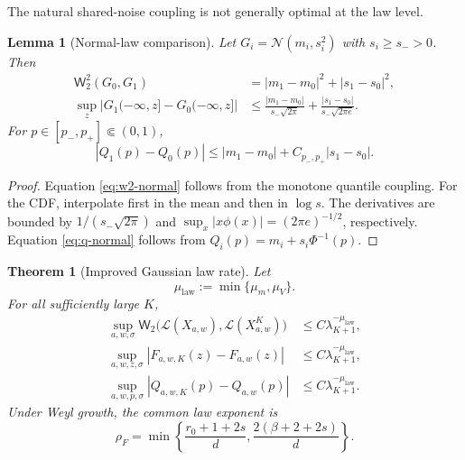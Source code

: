 \documentclass[11pt]{article}
\newtheorem{theorem}[assumption]{Theorem}
\newtheorem{lemma}[assumption]{Lemma}
\theoremstyle{remark}
\newcommand{\Law}{\mathcal L}
\newcommand{\Ph}{\Phi}
\newcommand{\ph}{\phi}
\newcommand{\Wtwo}{\mathsf W_2}
\begin{document}
The natural shared-noise coupling is not generally optimal at the law level.

\begin{lemma}[Normal-law comparison]\label{lem:normal-comparison}
Let $G_i=\mathcal N(m_i,s_i^2)$ with $s_i\ge s_->0$. Then
\begin{align}
 \Wtwo^2(G_0,G_1)
 &=|m_1-m_0|^2+|s_1-s_0|^2,
 \label{eq:w2-normal}\\
 \sup_z|G_1(-\infty,z]-G_0(-\infty,z]|
 &\le
 \frac{|m_1-m_0|}{s_-\sqrt{2\pi}}
 +\frac{|s_1-s_0|}{s_-\sqrt{2\pi e}}.
 \label{eq:kol-normal}
\end{align}
For $p\in[p_-,p_+]\Subset(0,1)$,
\begin{equation}\label{eq:q-normal}
 |Q_1(p)-Q_0(p)|
 \le|m_1-m_0|+C_{p_-,p_+}|s_1-s_0|.
\end{equation}
\end{lemma}

\begin{proof}
Equation \eqref{eq:w2-normal} follows from the monotone quantile coupling. For the CDF, interpolate first in the mean and then in $\log s$. The derivatives are bounded by $1/(s_-\sqrt{2\pi})$ and $\sup_x|x\ph(x)|=(2\pi e)^{-1/2}$, respectively. Equation \eqref{eq:q-normal} follows from $Q_i(p)=m_i+s_i\Ph^{-1}(p)$.
\end{proof}

\begin{theorem}[Improved Gaussian law rate]\label{thm:law-rate}
Let
\begin{equation}\label{eq:mulaw}
 \mu_{\mathrm{law}}:=\min\{\mu_m,\mu_V\}.
\end{equation}
For all sufficiently large $K$,
\begin{align}
 \sup_{a,w,\sigma}
 \Wtwo\big(\Law(X_{a,w}),\Law(X_{a,w}^{K})\big)
 &\le C\lambda_{K+1}^{-\mu_{\mathrm{law}}},
 \label{eq:w2-rate}\\
 \sup_{a,w,z,\sigma}|F_{a,w,K}(z)-F_{a,w}(z)|
 &\le C\lambda_{K+1}^{-\mu_{\mathrm{law}}},
 \label{eq:cdf-rate}\\
 \sup_{a,w,p,\sigma}|Q_{a,w,K}(p)-Q_{a,w}(p)|
 &\le C\lambda_{K+1}^{-\mu_{\mathrm{law}}}.
 \label{eq:q-rate}
\end{align}
Under Weyl growth, the common law exponent is
\begin{equation}\label{eq:rhoF}
 \rho_F
 =\min\left\{
 \frac{r_0+1+2s}{d},
 \frac{2(\beta+2+2s)}{d}
 \right\}.
\end{equation}
\end{theorem}
\end{document}
